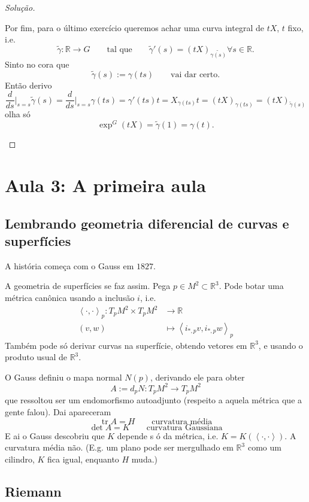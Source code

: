 \begin{proof}[Solução]
\begin{enumerate}
Por fim, para o último exercício queremos achar uma curva integral de \(tX\), \(t\) fixo, i.e.
\[\tilde{\gamma}:\mathbb{R}\to G\qquad \text{tal que} \qquad \tilde{\gamma}'(s)=(tX)_{\tilde{\gamma(s)}}\forall s \in \mathbb{R}.\]
Sinto no cora que 
\[\tilde{\gamma}(s):=\gamma(ts)\qquad \text{vai dar certo.} \]
Então derivo
\[\frac{d}{ds}\Big|_{s=s}\tilde{\gamma}(s)=\frac{d}{ds}\Big|_{s=s}\gamma(ts)=\gamma'(ts)t=X_{\gamma(t s)}t=(tX)_{\gamma( ts)}=(tX)_{\tilde{\gamma}(s)}\]
olha só
\[\operatorname{exp}^G(tX)=\tilde{\gamma}(1)=\gamma(t).\]

\end{enumerate}
\end{proof}

\section{Aula 3: A primeira aula}

\subsection{Lembrando geometria diferencial de curvas e superfícies}

A história começa com o Gauss em \(1827\).

A geometria de superfícies se faz assim. Pega \(p \in M^2 \subset \mathbb{R}^3\). Pode botar uma métrica canônica usando a inclusão \(i\), i.e.
\begin{align*}
	\left<\cdot,\cdot\right>_p: T_pM^2 \times T_pM^2 &\longrightarrow \mathbb{R} \\
	(v,w) &\longmapsto \left<i_{*,p}v,i_{*,p}w\right>_p
\end{align*}
Também pode só derivar curvas na superfície, obtendo vetores em \(\mathbb{R}^3\), e usando o produto usual de \(\mathbb{R}^3\).

O Gauss definiu o mapa normal \(N(p)\), derivando ele para obter
\[A:=d_p N : T_pM ^2 \to T_pM^2\]
que ressoltou ser um endomorfismo autoadjunto (respeito a aquela métrica que a gente falou). Dai apareceram
\[\operatorname{tr}A=H\qquad \text{curvatura média} \]
\[\det A=K\qquad \text{curvatura Gaussiana} \]
E ai o Gauss descobriu que \(K\) depende s ó da métrica, i.e. \(K=K(\left<\cdot,\cdot\right>)\). A curvatura média não. (E.g. um plano pode ser mergulhado em \(\mathbb{R}^3\) como um cilindro, \(K\) fica igual, enquanto \(H\) muda.)

\subsection{Riemann}

